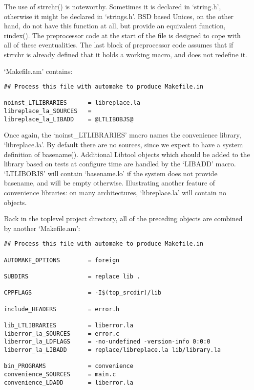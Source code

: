 The use of strrchr() is noteworthy. Sometimes it is declared in `string.h', otherwise it might be declared in `strings.h'. BSD based Unices, on the other hand, do not have this function at all, but provide an equivalent function, rindex(). The preprocessor code at the start of the file is designed to cope with all of these eventualities. The last block of preprocessor code assumes that if strrchr is already defined that it holds a working macro, and does not redefine it. 


`Makefile.am' contains: 

\begin{Verbatim}[frame=single]
## Process this file with automake to produce Makefile.in

noinst_LTLIBRARIES      = libreplace.la
libreplace_la_SOURCES   = 
libreplace_la_LIBADD    = @LTLIBOBJS@
\end{Verbatim}

Once again, the `noinst\_{}LTLIBRARIES' macro names the convenience library,
 `libreplace.la'. By default there are no sources, since we expect to have a system definition of basename(). Additional Libtool objects which should be added to the library based on tests at configure time are handled by the `LIBADD' macro. `LTLIBOBJS' will contain `basename.lo' if the system does not provide basename, and will be empty otherwise. Illustrating another feature of convenience libraries: on many architectures, `libreplace.la' will contain no objects. 


Back in the toplevel project directory, all of the preceding objects are 
combined by another `Makefile.am': 

\begin{Verbatim}[frame=single]
## Process this file with automake to produce Makefile.in

AUTOMAKE_OPTIONS        = foreign

SUBDIRS                 = replace lib .

CPPFLAGS                = -I$(top_srcdir)/lib

include_HEADERS         = error.h

lib_LTLIBRARIES         = liberror.la
liberror_la_SOURCES     = error.c
liberror_la_LDFLAGS     = -no-undefined -version-info 0:0:0
liberror_la_LIBADD      = replace/libreplace.la lib/library.la

bin_PROGRAMS            = convenience
convenience_SOURCES     = main.c
convenience_LDADD       = liberror.la
\end{Verbatim}

